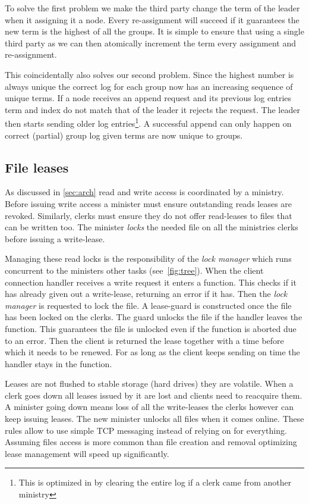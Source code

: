 To solve the first problem we make the third party change the term of the leader when it assigning it a node. Every re-assignment will succeed if it guarantees the new term is the highest of all the groups. It is simple to ensure that using a single third party as we can then atomically increment the term every assignment and re-assignment. 

This coincidentally also solves our second problem. Since the highest number is always unique the correct log for each group now has an increasing sequence of unique terms. If a node receives an append request and its previous log entries term and index do not match that of the leader it rejects the request. The leader then starts sending older log entries\footnote{This is optimized in \name{} by clearing the entire log if a clerk came from another ministry}. A successful append can only happen on correct (partial) group log given terms are now unique to groups.

\subsection{File leases}
As discussed in \cref{sec:arch} read and write access is coordinated by a ministry. Before issuing write access a minister must ensure outstanding reads leases are revoked. Similarly, clerks must ensure they do not offer read-leases to files that can be written too. The minister \emph{locks} the needed file on all the ministries clerks before issuing a write-lease. 

Managing these read locks is the responsibility of the \textit{lock manager} which runs concurrent to the ministers other tasks (see~\cref{fig:tree}). When the client connection handler \straightTasksLeg{} receives a write request it enters a  function. This checks if it has already given out a write-lease, returning an error if it has. Then the \textit{lock manager} is requested to lock the file. A lease-guard is constructed once the file has been locked on the clerks. The guard unlocks the file if the handler leaves the  function. This guarantees the file is unlocked even if the function is aborted due to an error. Then the client is returned the lease together with a time before which it needs to be renewed. For as long as the client keeps sending  on time the handler stays in the  function.

Leases are not flushed to stable storage (hard drives) they are volatile. When a clerk goes down all leases issued by it are lost and clients need to reacquire them. A minister going down means loss of all the write-leases the clerks however can keep issuing leases. The new minister unlocks all files when it comes online. These rules allow \name{} to use simple TCP messaging instead of relying on \raft{} for everything. Assuming files access is more common than file creation and removal optimizing lease management will speed up \name{} significantly.
%

